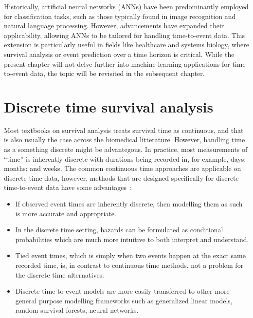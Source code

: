 Historically, artificial neural networks (ANNs) have been predominantly
employed for classification tasks, such as those typically found 
in image recognition and natural language processing. 
However, advancements have expanded their applicability, allowing ANNs 
to be tailored for handling time-to-event data.
This extension is particularly useful in fields like healthcare and systems
biology, where survival analysis or event prediction over a time horizon is
critical. 
While the present chapter will not delve further into machine learning
applications for time-to-event data, the topic will be revisited in the
subsequent chapter.





\section{Discrete time survival analysis}

Most textbooks on survival analysis treats survival time as continuous, 
and that is also usually the case across the biomedical litterature.
However, handling time as a something discrete might be advantegous.
In practice, most measurements of \enquote{time} is inherently discrete 
with durations being recorded in, for example, days; months; and weeks.
The common continuous time approaches are applicable on discrete time data,
however, methods that are designed specifically for discrete time-to-event 
data have some advantages~\autocite{tutzModeling2016}:

\begin{itemize}
    \item If observed event times are inherently discrete, 
        then modelling them as such is more accurate and appropriate. 
    \item In the discrete time setting, hazards can be formulated as 
        conditional probabilities which are much more intuitive to 
        both interpret and understand.
    \item Tied event times, 
        which is simply when two events happen at the exact same recorded time,
        is, in contrast to continuous time methods,
        not a problem for the discrete time alternatives.
    \item Discrete time-to-event models are more easily transferred to 
        other more general purpose modelling frameworks 
        such as generalized linear models, random survival forests, 
        neural networks.
\end{itemize}

